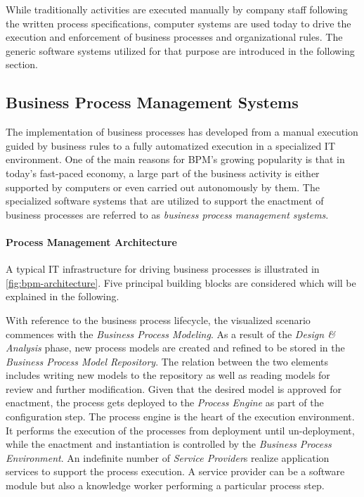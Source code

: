 
%
While traditionally activities are executed manually by company staff following the written process specifications, computer systems are used today to drive the execution and enforcement of business processes and organizational rules.
The generic software systems utilized for that purpose are introduced in the following section.

\subsection{Business Process Management Systems}\label{ch:bg:bpms}
The implementation of business processes has developed from a manual execution guided by business rules to a fully automatized execution in a specialized IT environment.
One of the main reasons for \acs{BPM}'s growing popularity is that in today's fast-paced economy, a large part of the business activity is either supported by computers or even carried out autonomously by them.
The specialized software systems that are utilized to support the enactment of business processes are referred to as \emph{business process management systems}.

\paragraph{Process Management Architecture}
A typical IT infrastructure for driving business processes is illustrated in \autoref{fig:bpm-architecture}. 
Five principal building blocks are considered which will be explained in the following.

With reference to the business process lifecycle, the visualized scenario commences with the \emph{Business Process Modeling}. As a result of the \emph{Design \& Analysis} phase, new process models are created and refined to be stored in the \emph{Business Process Model Repository}. 
The relation between the two elements includes writing new models to the repository as well as reading models for review and further modification.
Given that the desired model is approved for enactment, the process gets deployed to the \emph{Process Engine} as part of the configuration step.
The process engine is the heart of the execution environment. It performs the execution of the processes from deployment until un-deployment, while the enactment and instantiation is controlled by the \emph{Business Process Environment}.
An indefinite number of \emph{Service Provider}s realize application services to support the process execution. A service provider can be a software module but also a knowledge worker performing a particular process step.

